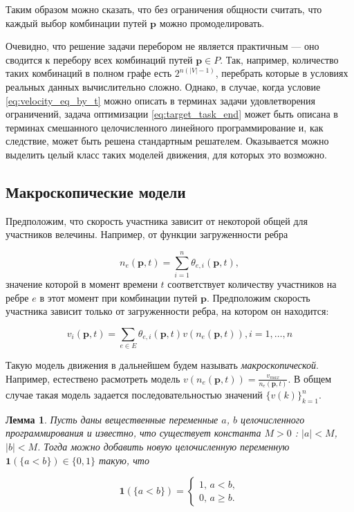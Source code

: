 \documentclass[12pt, a4paper]{article}
\newtheorem{lemma}{Лемма}[section]
\begin{document}
Таким образом можно сказать, что без ограничения общности считать, что каждый выбор комбинации путей $\textbf{p}$ можно промоделировать.

Очевидно, что решение задачи перебором не является практичным --- оно сводится к перебору всех комбинаций путей $\textbf{p} \in P$. Так, например, количество таких комбинаций в полном графе есть $2^{n (|V| - 1)}$, перебрать которые в условиях реальных данных вычислительно сложно.
Однако, в случае, когда условие \eqref{eq:velocity_eq_by_t} можно описать в терминах задачи удовлетворения ограничений, задача оптимизации \eqref{eq:target_task_end} может быть описана в терминах смешанного целочисленного линейного программирование и, как следствие, может быть решена стандартным решателем. Оказывается можно выделить целый класс таких моделей движения, для которых это возможно.

\subsection{Макроскопические модели}

Предположим, что скорость участника зависит от некоторой общей для участников велечины. Например, от функции загруженности ребра

$$ n_{e}(\textbf{p}, t) = \sum\limits_{i = 1}^n\theta_{e, i}(\textbf{p}, t),$$
значение которой в момент времени $t$ соответствует количеству участников на ребре $e$ в этот момент при комбинации путей $\textbf{p}$. Предположим скорость участника зависит только от загруженности ребра, на котором он находится:

\begin{equation}
	\label{eq:velocity_eq_macro}
	 v_i(\textbf{p}, t) = \sum \limits _{e \in E} \theta_{e, i} (\textbf{p}, t) v (n_e (\textbf{p}, t)),  i = 1, \dots, n
\end{equation}

Такую модель движения в дальнейшем будем называть \textit{макроскопической}.
Например, естествено расмотреть модель $ v (n_e (\textbf{p}, t)) = \frac{v_{max}}{n_e (\textbf{p}, t)}$. В общем случае такая модель задается последовательностью значений  $\{v(k)\}_{k = 1}^n$.

\begin{lemma}
	\label{lemma:lt}
	Пусть даны вещественные переменные $a$, $b$ целочисленного программирования и известно, что существует константа $M > 0$ : $|a| < M$, $|b| < M$. Тогда можно добавить новую целочисленную переменную $\textbf{1} (\{a < b\}) \in \{0, 1\}$ такую, что
	
	\begin{equation*}
		\textbf{1} (\{a < b\}) = 
		\begin{cases}
			1,\, a < b,
			\\
			0,\, a \ge b.
		\end{cases}
	\end{equation*}

\end{lemma}
\end{document}
